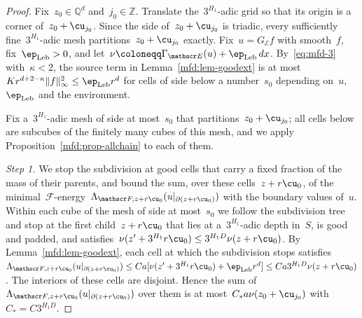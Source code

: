 \documentclass[11pt]{amsart}
\begin{document}
\begin{proof}
Fix~$z_0\in\mathbb Q^d$ and~$j_0\in\mathbb Z$. Translate the~$3^{H_1}$-adic grid so that its origin is a corner of~$z_0+\cu_{j_0}$. Since the side of~$z_0+\cu_{j_0}$ is triadic, every sufficiently fine~$3^{H_1}$-adic mesh partitions~$z_0+\cu_{j_0}$ exactly. Fix~$u=G_{\mathscr E}f$ with smooth~$f$, fix~$\ep_{\rm Leb}>0$, and let~$\nu\coloneqq\Gamma_{\mathscr E}(u)+\ep_{\rm Leb}\,dx$. By~\eqref{eq:mfd-3} with~$\kappa<2$, the source term in Lemma~\ref{mfd:lem-goodext} is at most~$Kr^{d+2-\kappa}\|f\|_\infty^2\leq\ep_{\rm Leb} r^d$ for cells of side below a number~$s_0$ depending on~$u$,~$\ep_{\rm Leb}$ and the environment.

\smallskip

Fix a~$3^{H_1}$-adic mesh of side at most~$s_0$ that partitions~$z_0+\cu_{j_0}$; all cells below are subcubes of the finitely many cubes of this mesh, and we apply Proposition~\ref{mfd:prop-allchain} to each of them.

\smallskip

\emph{Step 1.} We stop the subdivision at good cells that carry a fixed fraction of the mass of their parents, and bound the sum, over these cells~$z+r\cu_0$, of the minimal~$\mathscr F$-energy~$\Lambda_{\mathscr F,z+r\cu_0}(u|_{\partial(z+r\cu_0)})$ with the boundary values of~$u$. Within each cube of the mesh of side at most~$s_0$ we follow the subdivision tree and stop at the first child~$z+r\cu_0$ that lies at a~$3^{H_1}$-adic depth in~$S$, is good and padded, and satisfies~$\nu(z'+3^{H_1}r\cu_0)\leq3^{H_1D}\nu(z+r\cu_0)$. By Lemma~\ref{mfd:lem-goodext}, each cell at which the subdivision stops satisfies~$\Lambda_{\mathscr F,z+r\cu_0}(u|_{\partial(z+r\cu_0)})\leq Ca[\nu(z'+3^{H_1}r\cu_0)+\ep_{\rm Leb} r^d]\leq Ca3^{H_1D}\nu(z+r\cu_0)$. The interiors of these cells are disjoint. Hence the sum of~$\Lambda_{\mathscr F,z+r\cu_0}(u|_{\partial(z+r\cu_0)})$ over them is at most~$C_*a\nu(z_0+\cu_{j_0})$ with~$C_*=C3^{H_1D}$.

\smallskip


\end{proof}
\end{document}
